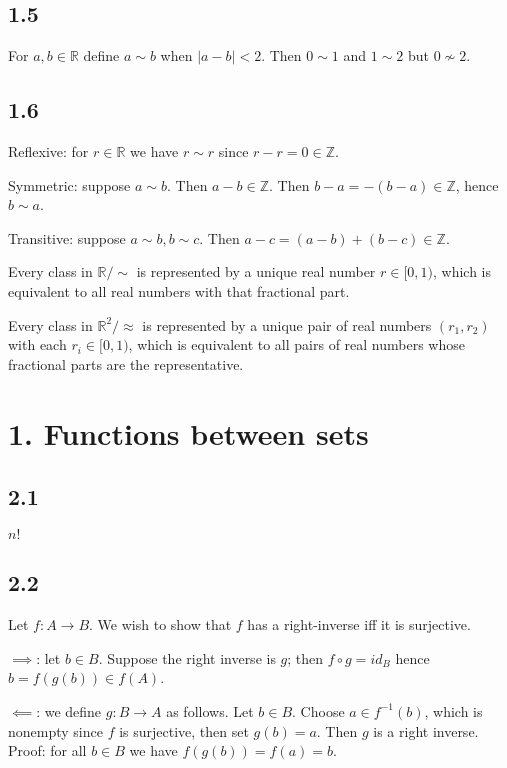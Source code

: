 \documentclass{article}
\def\R{\mathbb{R}}
\def\Z{\mathbb{Z}}
\begin{document}
\subsection*{1.5}

For $a, b \in \R$ define $a \sim b$ when $|a - b| < 2$. Then $0 \sim 1$ and $1 \sim 2$ but $0 \not\sim 2$.

\subsection*{1.6}

Reflexive: for $r \in \R$ we have $r \sim r$ since $r - r = 0 \in \Z$.

Symmetric: suppose $a \sim b$. Then $a - b \in \Z$. Then $b - a = -(b - a) \in \Z$, hence $b \sim a$.

Transitive: suppose $a \sim b, b \sim c$. Then $a - c = (a - b) + (b - c) \in \Z$.

Every class in $\R / \sim$ is represented by a unique real number $r \in [0, 1)$, which is equivalent to all real numbers with that fractional part.

Every class in $\R^2 / \approx$ is represented by a unique pair of real numbers $(r_1, r_2)$ with each $r_i \in [0, 1)$, which is equivalent to all pairs of real numbers whose fractional parts are the representative.

\section*{1. Functions between sets}

\subsection*{2.1}

$n!$

\subsection*{2.2}

Let $f: A \to B$. We wish to show that $f$ has a right-inverse iff it is surjective.

$\implies$: let $b \in B$. Suppose the right inverse is $g$; then $f \circ g = id_B$ hence $b = f(g(b)) \in f(A)$.

$\impliedby$: we define $g: B \to A$ as follows. Let $b \in B$. Choose $a \in f^{-1}(b)$, which is nonempty since $f$ is surjective, then set $g(b) = a$. Then $g$ is a right inverse. Proof: for all $b \in B$ we have $f(g(b)) = f(a) = b$.
\end{document}
